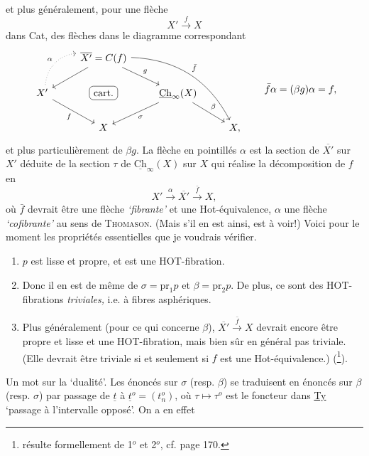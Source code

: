 \documentclass[11pt]{article}
\newcommand{\printedpage}[1]{\marginpar{\footnotesize p.~#1}}
\newcommand{\msp}[1]{\marginpar{\footnotesize [#1]}}
\newcommand{\uCh}{\underline{\mathrm{Ch}}}
\begin{document}
et plus généralement, pour une flèche
\[
X'\xrightarrow{\ f\ }X
\]
dans Cat, des flèches dans le diagramme correspondant
\[
\begin{tikzcd}
& \overline{X'}=C(f) \arrow[dl] \arrow[dr, "g"] \arrow[ddrr, bend left=30, "\bar{f}"] & & \\
X' \arrow[ur, dotted, bend left=40, "\alpha"] \arrow[dr, "f"'] & |[draw, rounded corners]| \text{cart.} & \uCh_\infty(X) \arrow[dl, "\sigma"] \arrow[dr, "\beta"] & \\
& X & & X,
\end{tikzcd}
\qquad
\bar{f}\alpha=(\beta g)\alpha=f,
\]
et plus particulièrement de $\beta g$. La flèche
\msp{page 139}
en pointillés $\alpha$ est la section de $\overline{X'}$ sur $X'$ déduite de la section $\tau$ de $\uCh_\infty(X)$ sur $X$ qui réalise la décomposition de $f$ en
\[
X'\xrightarrow{\ \alpha\ }\overline{X'}\xrightarrow{\ \bar{f}\ }X,
\]
où $\bar{f}$ devrait être une flèche \textit{`fibrante'} et une Hot-équivalence, $\alpha$ une flèche \textit{`cofibrante'} au sens de \textsc{Thomason}. (Mais s'il en est ainsi, est à voir!) Voici pour le moment les propriétés essentielles que je voudrais vérifier.

\begin{enumerate}[label={}, leftmargin=*]
\item[1$^o$)] $p$ est lisse et propre, et est une HOT-fibration.

\item[2$^o$)] Donc il en est de même de $\sigma=\mathrm{pr}_1p$ et $\beta=\mathrm{pr}_2p$. De plus, ce sont des HOT-fibrations \textit{triviales,} i.e. à fibres asphériques.

\printedpage{87}

\item[3$^o$)] Plus généralement (pour ce qui concerne $\beta$), $\overline{X'}\xrightarrow{\ \bar{f}\ }X$ devrait encore être propre et lisse et une HOT-fibration, mais bien sûr en général pas triviale. (Elle devrait être triviale si et seulement si $f$ est une Hot-équivalence.) (\footnote[30]{résulte formellement de 1$^o$ et 2$^o$, cf. page 170.}).
\end{enumerate}

Un mot sur la `dualité'. Les énoncés sur $\sigma$ (resp. $\beta$) se traduisent en énoncés sur $\beta$ (resp. $\sigma$) par passage de $\underline{t}$ à $\underline{t}^o=(t^o_n)$, où $\tau\longmapsto\tau^o$ est le foncteur dans \underline{Ty} `passage à l'intervalle opposé'. On a en effet %
\end{document}
